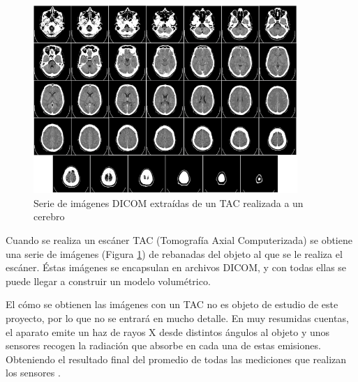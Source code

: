 \begin{figure}[H]
	\centering
	\includegraphics[width=10cm]{imagenes/brain_dicom_serie}
	\caption{Serie de imágenes DICOM extraídas de un TAC realizada a un cerebro}
	\label{fig:brain_dicom_serie}
\end{figure}

Cuando se realiza un escáner TAC (Tomografía Axial Computerizada) se obtiene una serie de imágenes (Figura \ref{fig:brain_dicom_serie}) de rebanadas del objeto al que se le realiza el escáner. Éstas imágenes se encapsulan en archivos DICOM, y con todas ellas se puede llegar a construir un modelo volumétrico.

El cómo se obtienen las imágenes con un TAC no es objeto de estudio de este proyecto, por lo que no se entrará en mucho detalle. En muy resumidas cuentas, el aparato emite un haz de rayos X desde distintos ángulos al objeto y unos sensores recogen la radiación que absorbe en cada una de estas emisiones. Obteniendo el resultado final del promedio de todas las mediciones que realizan los sensores \cite{tac}. 